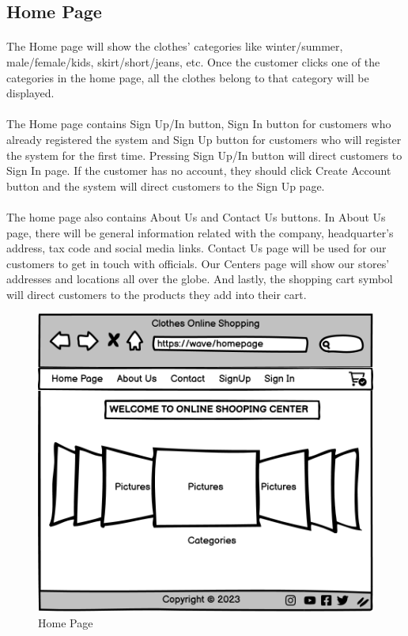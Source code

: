 \subsection{Home Page}
\bigskip
\paragraph{}
The Home page will show the clothes’ categories like winter/summer,  male/\newline female/kids, skirt/short/jeans, etc. Once the customer clicks one of the 
categories in the home page, all the clothes belong to that category will be displayed. 
\paragraph{}
The Home page contains Sign Up/In button, Sign In button for customers who already registered the system and Sign Up button for customers who will register 
the system for the first time. Pressing Sign Up/In button will direct customers to Sign In page. If the customer has no account, they should click Create 
Account button and the system will direct customers to the Sign Up page.
\paragraph{}
The home page also contains About Us and Contact Us buttons. In About Us page, there will be general information related with the company, headquarter’s 
address, tax code and social media links. Contact Us page will be used for our customers to get in touch with officials. Our Centers page will show our 
stores’ addresses and locations all over the globe. And lastly, the shopping cart symbol will direct customers to the products they add into their cart.

\bigskip
\bigskip
\bigskip
\begin{figure}[h]
\centerline{\includegraphics[scale=1]{images/Home.png}}
\caption{Home Page}
\label{fig}
\end{figure}